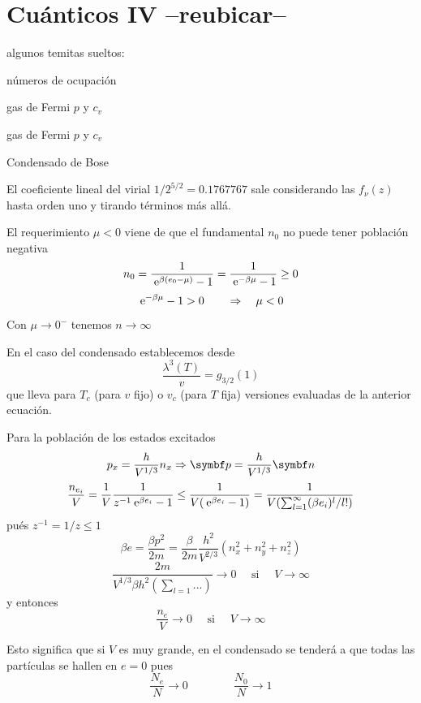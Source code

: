 \documentclass[10pt,oneside]{CBFT_book}
\begin{document}
\section{Cuánticos IV --reubicar--}

algunos temitas sueltos:

números de ocupación

gas de Fermi $p$ y $c_v$

gas de Fermi $p$ y $c_v$

Condensado de Bose


El coeficiente lineal del virial $ 1/ 2^{5/2} = 0.1767767 $ sale considerando las $ f_{\nu}(z) $ hasta orden
uno y tirando términos más allá.


El requerimiento $ \mu < 0 $ viene de que el fundamental $ n_0 $ no puede tener población negativa
\[
	n_0 = \frac{1}{\:\mathrm{e}^{\beta(e_0 - \mu)} -1} = \frac{1}{\:\mathrm{e}^{-\beta\mu} -1} \geq 0
\]
\[
	\:\mathrm{e}^{-\beta\mu} -1 > 0 \qquad \Rightarrow \quad \mu < 0
\]
Con $\mu \to 0^-$ tenemos $ n \to \infty $

En el caso del condensado establecemos desde 
\[
	\frac{\lambda^3(T)}{v} = g_{3/2}(1) 
\]
que lleva para $T_c$ (para $v$ fijo) o $v_c$ (para $T$ fija) versiones evaluadas de la anterior ecuación.

Para la población de los estados excitados
\[
	p_x = \frac{h}{V^{1/3}}n_x \Rightarrow  \vb{p} = \frac{h}{V^{1/3}} \vb{n}
\]
\[
	\frac{n_{e_i}}{V} = \frac{1}{V} \frac{1}{ z^{-1}\:\mathrm{e}^{\beta e_i} - 1 } \leq 
	\frac{1}{V(\:\mathrm{e}^{\beta e_i} - 1)} = \frac{1}{V(\sum_{l=1}^\infty (\beta e_i )^l/l!)}
\]
pués $z^{-1} = 1/z \leq 1$
\[
	\beta e = \frac{\beta p^2}{2m} = \frac{\beta}{2m} \frac{h^2}{V^{2/3}} ( n_x^2 + n_y^2 + n_z^2)
\]
\[
	\frac{2m}{V^{1/3} \beta h^2 (\sum_{l=1} ... )} \to 0 \quad \text{ si } \quad V \to \infty
\]
y entonces
\[
	\frac{n_e}{V} \to 0 \quad \text{ si } \quad V \to \infty
\]

Esto significa que si $V$ es muy grande, en el condensado se tenderá a que todas las partículas se hallen en
$ e = 0 $ pues 
\[
	\frac{N_e}{N} \to 0 \qquad \qquad \frac{N_0}{N} \to 1
\]
\end{document}
